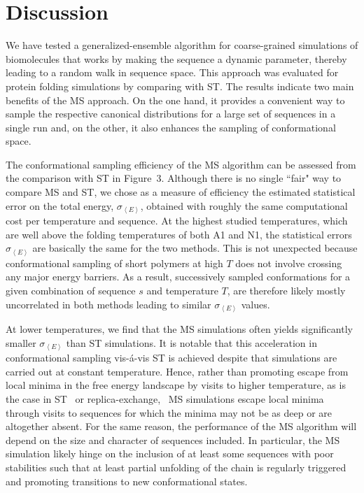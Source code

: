 \documentclass[%
 aip,
rsi,%
 amsmath,amssymb,
 reprint,%
]{revtex4-1}
\newcommand	 {\sbar}	{{s}}
\newcommand {\sigE}	{{\sigma_{\left < E \right >}}}
\begin{document}
\section{Discussion}
\noindent
We have tested a generalized-ensemble algorithm for coarse-grained simulations of biomolecules that works by making the sequence a dynamic parameter, thereby leading to a random walk in sequence space. This approach was evaluated for protein folding simulations by comparing with ST. The results indicate two main benefits of the MS approach. On the one hand, it provides a convenient way to sample the respective canonical distributions for a large set of sequences in a single run and, on the other, it also enhances the sampling of conformational space. 

The conformational sampling efficiency of the MS algorithm can be assessed from the comparison with ST in Figure~3. Although there is no single ``fair" way to compare MS and ST, we chose as a measure of efficiency the estimated statistical error on the total energy, $\sigE$, obtained with roughly the same computational cost per temperature and sequence. At the highest studied temperatures, which are well above the folding temperatures of both A1 and N1, the statistical errors $\sigE$ are basically the same for the two methods. This is not unexpected because conformational sampling of short polymers at high $T$ does not involve crossing any major energy barriers. As a result, successively sampled conformations for a given combination of sequence $\sbar$ and temperature $T$, are therefore likely mostly uncorrelated in both methods leading to similar $\sigE$ values. 

At lower temperatures, we find that the MS simulations often yields significantly smaller $\sigE$ than ST simulations. It is notable that this acceleration in conformational sampling vis-{\'a}-vis ST is achieved despite that simulations are carried out at constant temperature. Hence, rather than promoting escape from local minima in the free energy landscape by visits to higher temperature, as is the case in  ST~\cite{Marinari1992,Lyubartsev1992} or replica-exchange,~\cite{Swendsen1986}  MS simulations escape local minima through visits to sequences for which the minima may not be as deep or are altogether absent. For the same reason, the performance of the MS algorithm will depend on the size and character of sequences included. In particular, the MS simulation likely hinge on the inclusion of at least some sequences with poor stabilities such that at least partial unfolding of the chain is regularly triggered and promoting transitions to new conformational states. 
\end{document}
